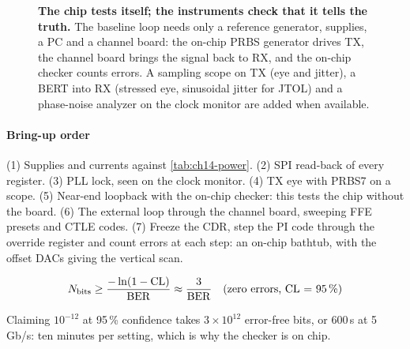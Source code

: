 \begin{figure}[!tbp]
\centering

\caption{\textbf{The chip tests itself; the instruments check that it tells the truth.} The baseline loop needs only a reference generator, supplies, a PC and a channel board: the on-chip PRBS generator drives TX, the channel board brings the signal back to RX, and the on-chip checker counts errors. A sampling scope on TX (eye and jitter), a BERT into RX (stressed eye, sinusoidal jitter for JTOL) and a phase-noise analyzer on the clock monitor are added when available.}
\label{fig:ch15-labsetup}
\end{figure}

\paragraph{Bring-up order} (1) Supplies and currents against \cref{tab:ch14-power}. (2) SPI read-back of every register. (3) PLL lock, seen on the clock monitor. (4) TX eye with PRBS7 on a scope. (5) Near-end loopback with the on-chip checker: this tests the chip without the board. (6) The external loop through the channel board, sweeping FFE presets and CTLE codes. (7) Freeze the CDR, step the PI code through the override register and count errors at each step: an on-chip bathtub, with the offset DACs giving the vertical scan.

\begin{keyeq}
\begin{equation}
  N_\mathrm{bits}\ge\frac{-\ln(1-\mathrm{CL})}{\mathrm{BER}}\approx\frac{3}{\mathrm{BER}}\quad\text{(zero errors, CL = 95\,\%)}
  \label{eq:ch15-bits}
\end{equation}
\end{keyeq}

Claiming $10^{-12}$ at 95\,\% confidence takes $3\times10^{12}$ error-free bits, or 600\,s at 5\,Gb/s: ten minutes per setting, which is why the checker is on chip.

